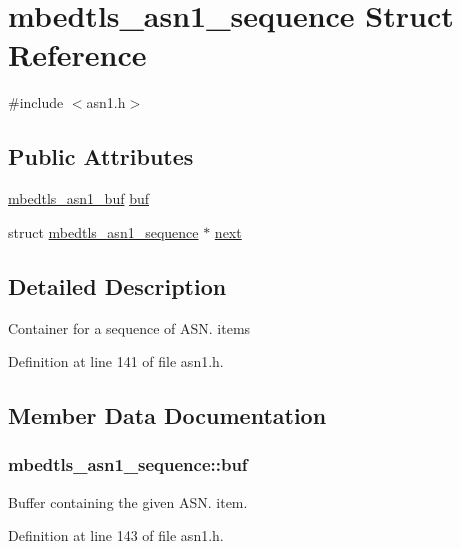 \hypertarget{structmbedtls__asn1__sequence}{\section{mbedtls\-\_\-asn1\-\_\-sequence Struct Reference}
\label{structmbedtls__asn1__sequence}
}


{\ttfamily \#include $<$asn1.\-h$>$}

\subsection*{Public Attributes}
\begin{DoxyCompactItemize}
\item 
\hyperlink{structmbedtls__asn1__buf}{mbedtls\-\_\-asn1\-\_\-buf} \hyperlink{structmbedtls__asn1__sequence_a6ef535e31a30926169ee6877af393434}{buf}
\item 
struct \hyperlink{structmbedtls__asn1__sequence}{mbedtls\-\_\-asn1\-\_\-sequence} $\ast$ \hyperlink{structmbedtls__asn1__sequence_ac81969ddae2ace4340503530588d83e1}{next}
\end{DoxyCompactItemize}


\subsection{Detailed Description}
Container for a sequence of A\-S\-N. items 

Definition at line 141 of file asn1.\-h.



\subsection{Member Data Documentation}
\hypertarget{structmbedtls__asn1__sequence_a6ef535e31a30926169ee6877af393434}{
\subsubsection[{buf}]{ mbedtls\-\_\-asn1\-\_\-sequence\-::buf}}\label{structmbedtls__asn1__sequence_a6ef535e31a30926169ee6877af393434}
Buffer containing the given A\-S\-N. item. 

Definition at line 143 of file asn1.\-h.

